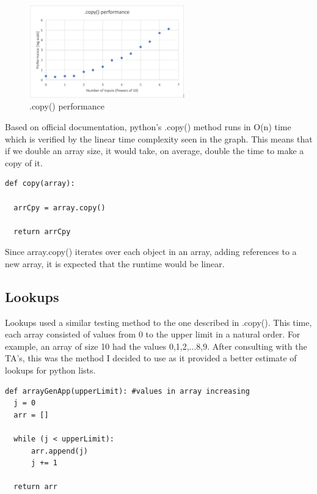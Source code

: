 \documentclass[12pt]{article}
\begin{document}
\begin{figure}[H]
\centering
\includegraphics[width=0.6\textwidth,height=\textheight,keepaspectratio]{copygraph.png}
\caption{.copy() performance}
\label{Figure: copygraph}
\end{figure}

Based on official documentation, python's .copy() method runs in O(n) time which is verified by the linear time complexity seen in the graph. This means that if we double an array size, it would take, on average, double the time to make a copy of it. 

\footnotesize
\begin{verbatim}
def copy(array):

  arrCpy = array.copy()

  return arrCpy
\end{verbatim}
\normalsize

Since array.copy() iterates over each object in an array, adding references to a new array, it is expected that the runtime would be linear.

\subsection{Lookups}

Lookups used a similar testing method to the one described in .copy(). This time, each array consisted of values from 0 to the upper limit in a natural order. For example, an array of size 10 had the values 0,1,2,...8,9. After consulting with the TA's, this was the method I decided to use as it provided a better estimate of lookups for python lists.

\footnotesize
\begin{verbatim}
def arrayGenApp(upperLimit): #values in array increasing
  j = 0
  arr = []
  
  while (j < upperLimit):
      arr.append(j)
      j += 1

  return arr
\end{verbatim}
\normalsize
\end{document}
